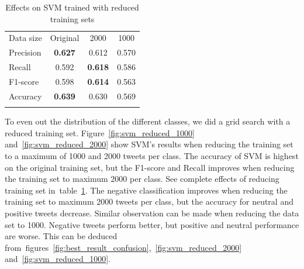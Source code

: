 \begin{table}[t!]
	\centering
	\begin{tabular}{l|ccc} 
	\noalign{\smallskip}\hline\noalign{\smallskip}
	Data size  & Original       & 2000   & 1000 \\
	\noalign{\smallskip}\hline\noalign{\smallskip}
	Precision  & {\bf 0.627}  & 0.612 & 0.570 \\
	Recall       & 0.592  & \textbf{0.618} & 0.586 \\
	F1-score  & 0.598  & \textbf{0.614} & 0.563 \\
	Accuracy & {\bf 0.639}  & 0.630 & 0.569 \\
	\noalign{\smallskip}\hline\noalign{\smallskip}
	\end{tabular}
	\caption{Effects on SVM trained with reduced training sets}
	\label{tab:svm_reduced}
\end{table}

To even out the distribution of the different classes, we did a grid search with a reduced training set. Figure~\ref{fig:svm_reduced_1000} and~\ref{fig:svm_reduced_2000} show SVM's results when reducing the training set to a maximum of 1000 and 2000 tweets per class. The accuracy of SVM is highest on the original training set, but the F1-score and Recall improves when reducing the training set to maximum 2000 per class. See complete effects of reducing training set in~table~\ref{tab:svm_reduced}. The negative classification improves when reducing the training set to maximum 2000 tweets per class, but the accuracy for neutral and positive tweets decrease. Similar observation can be made when reducing the data set to 1000. Negative tweets perform better, but positive and neutral performance are worse. This can be deduced from~figures~\ref{fig:best_result_confusion},~\ref{fig:svm_reduced_2000} and~\ref{fig:svm_reduced_1000}.

